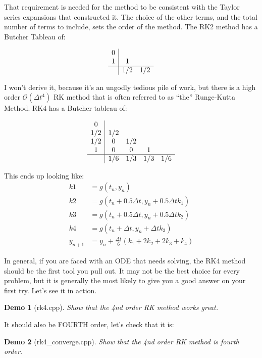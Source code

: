 \documentclass{article}
\theoremstyle{demo}
\newtheorem{demo}{Demo}[section]
\begin{document}
That requirement is needed for the method to be consistent with the Taylor
series expansions that constructed it.  The choice of the other terms, and the
total number of terms to include, sets the order of the method. The RK2 method
has a Butcher Tableau of:

\[
\begin{array}{c|cccc}
    0\\
    1 & 1 \\
    \hline
    & 1/2 & 1/2 
\end{array}
\]

I won't derive it, because it's an ungodly tedious pile of work, but there is a
high order $\mathcal{O}(\Delta t^4)$ RK method that is often referred to as
``the'' Runge-Kutta Method.  RK4 has a Butcher tableau of:

\[
\begin{array}{c|cccc}
    0\\
    1/2 & 1/2 \\
    1/2 & 0 & 1/2 \\
    1 & 0 & 0 & 1 \\
    \hline
    & 1/6 & 1/3 & 1/3 & 1/6
\end{array}
\]

This ends up looking like:
\begin{equation}
    \begin{aligned}
        k1 &= g(t_n, y_n) \\
        k2 &= g(t_n+0.5\Delta t, y_n + 0.5\Delta t k_1) \\
        k3 &= g(t_n+0.5\Delta t, y_n + 0.5\Delta t k_2) \\
        k4 &= g(t_n+\Delta t, y_n + \Delta t k_3) \\
        y_{n+1} &= y_n + \frac{\Delta t}{6}(k_1 + 2k_2 + 2k_3 + k_4)
    \end{aligned}
\end{equation}

In general, if you are faced with an ODE that needs solving, the RK4 method
should be the first tool you pull out.  It may not be the best choice for every
problem, but it is generally the most likely to give you a good answer on your
first try.  Let's see it in action.

\begin{demo}[rk4.cpp]
    Show that the 4nd order RK method works great.
\end{demo}

It should also be FOURTH order, let's check that it is:
\begin{demo}[rk4\_converge.cpp]
    Show that the 4nd order RK method is fourth order.
\end{demo}
\end{document}
